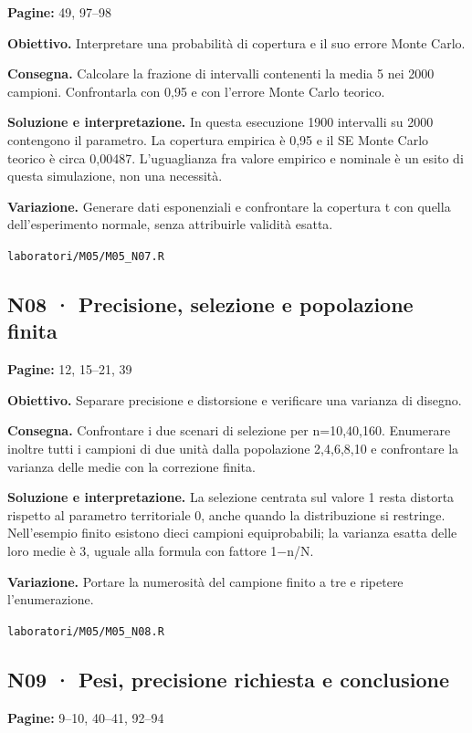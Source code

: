\documentclass[11pt,a4paper]{article}
\begin{document}
\textbf{Pagine:} 49, 97–98

\textbf{Obiettivo.} Interpretare una probabilità di copertura e il suo errore Monte Carlo.

\textbf{Consegna.} Calcolare la frazione di intervalli contenenti la media 5 nei 2000 campioni. Confrontarla con 0,95 e con l’errore Monte Carlo teorico.

\textbf{Soluzione e interpretazione.} In questa esecuzione 1900 intervalli su 2000 contengono il parametro. La copertura empirica è 0,95 e il SE Monte Carlo teorico è circa 0,00487. L’uguaglianza fra valore empirico e nominale è un esito di questa simulazione, non una necessità.

\textbf{Variazione.} Generare dati esponenziali e confrontare la copertura t con quella dell’esperimento normale, senza attribuirle validità esatta.

\texttt{laboratori/M05/M05\_N07.R}

\subsection*{N08 · Precisione, selezione e popolazione finita}

\textbf{Pagine:} 12, 15–21, 39

\textbf{Obiettivo.} Separare precisione e distorsione e verificare una varianza di disegno.

\textbf{Consegna.} Confrontare i due scenari di selezione per n=10,40,160. Enumerare inoltre tutti i campioni di due unità dalla popolazione 2,4,6,8,10 e confrontare la varianza delle medie con la correzione finita.

\textbf{Soluzione e interpretazione.} La selezione centrata sul valore 1 resta distorta rispetto al parametro territoriale 0, anche quando la distribuzione si restringe. Nell’esempio finito esistono dieci campioni equiprobabili; la varianza esatta delle loro medie è 3, uguale alla formula con fattore 1−n/N.

\textbf{Variazione.} Portare la numerosità del campione finito a tre e ripetere l’enumerazione.

\texttt{laboratori/M05/M05\_N08.R}

\newpage

\subsection*{N09 · Pesi, precisione richiesta e conclusione}

\textbf{Pagine:} 9–10, 40–41, 92–94
\end{document}
